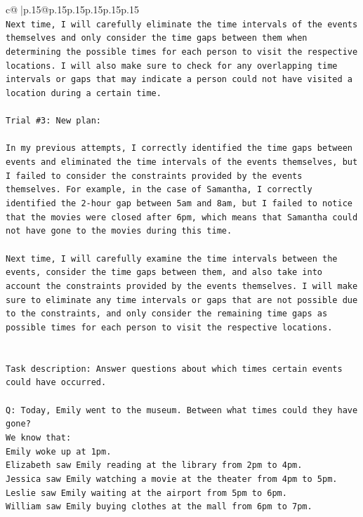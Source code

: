 \documentclass{article}
\begin{document}
{\begin{supertabular}{c@{$\;$}|p{.15\linewidth}@{}p{.15\linewidth}p{.15\linewidth}p{.15\linewidth}p{.15\linewidth}p{.15\linewidth}}
{{{\\ 
\texttt{Next time, I will carefully eliminate the time intervals of the events themselves and only consider the time gaps between them when determining the possible times for each person to visit the respective locations. I will also make sure to check for any overlapping time intervals or gaps that may indicate a person could not have visited a location during a certain time.} \\
\\ 
\texttt{Trial \#3: New plan: } \\
\\ 
\texttt{In my previous attempts, I correctly identified the time gaps between events and eliminated the time intervals of the events themselves, but I failed to consider the constraints provided by the events themselves. For example, in the case of Samantha, I correctly identified the 2{-}hour gap between 5am and 8am, but I failed to notice that the movies were closed after 6pm, which means that Samantha could not have gone to the movies during this time.} \\
\\ 
\texttt{Next time, I will carefully examine the time intervals between the events, consider the time gaps between them, and also take into account the constraints provided by the events themselves. I will make sure to eliminate any time intervals or gaps that are not possible due to the constraints, and only consider the remaining time gaps as possible times for each person to visit the respective locations.} \\
\\ 
\\ 
\texttt{Task description: Answer questions about which times certain events could have occurred.} \\
\\ 
\texttt{Q: Today, Emily went to the museum. Between what times could they have gone?} \\
\texttt{We know that:} \\
\texttt{Emily woke up at 1pm.} \\
\texttt{Elizabeth saw Emily reading at the library from 2pm to 4pm.} \\
\texttt{Jessica saw Emily watching a movie at the theater from 4pm to 5pm.} \\
\texttt{Leslie saw Emily waiting at the airport from 5pm to 6pm.} \\
\texttt{William saw Emily buying clothes at the mall from 6pm to 7pm.} \\
}}}
\end{supertabular}}
\end{document}
